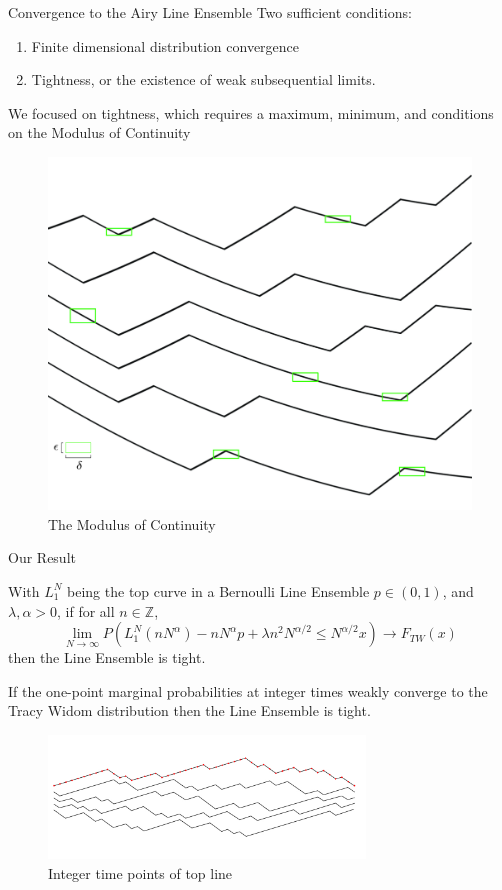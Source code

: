 \documentclass[9pt,t,dvipsnames]{beamer}
\begin{document}
\begin{frame}{Convergence to the Airy Line Ensemble}
	Two sufficient conditions:\begin{enumerate}
		\item Finite dimensional distribution convergence
		\item Tightness, or the existence of weak subsequential limits.
	\end{enumerate}
We focused on tightness, which requires a maximum, minimum, and conditions on the Modulus of Continuity
\begin{figure}
	\includegraphics[height=0.55\textheight]{graphics/ModulusCont.jpg}
	\caption{The Modulus of Continuity}
\end{figure}

\end{frame}

\begin{frame}{Our Result}
\begin{theorem}With $L_1^N$ being the top curve in a Bernoulli Line Ensemble $p\in (0,1)$, and $\lambda, \alpha>0$, if for all $n\in \mathbb{Z}$,
\[\lim_{N\to\infty}P(L_1^{N}(nN^{\alpha}) - nN^{\alpha} p + \lambda n^2 N^{\alpha/2} \leq N^{\alpha/2} x) \to F_{TW}(x)\]
then the Line Ensemble is tight.
\end{theorem}
If the one-point marginal probabilities at integer times weakly converge to the Tracy Widom distribution then the Line Ensemble is tight.
\begin{figure}
	\includegraphics[width=0.75\textwidth]{graphics/ConvToTW.jpg}
	\caption{Integer time points of top line}
\end{figure}
\end{frame}
\end{document}
